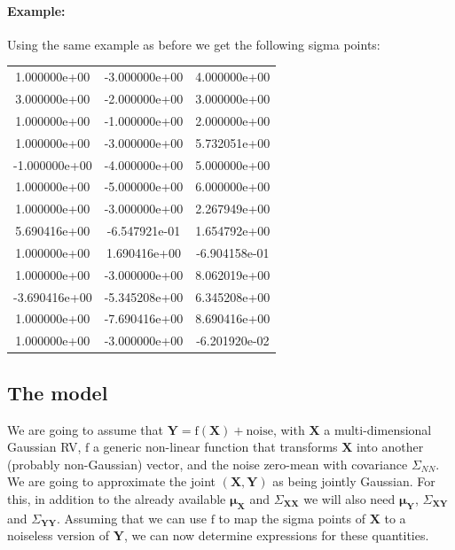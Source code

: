 \paragraph{Example: }

Using the same example as before we get the following sigma points:

\begin{tabular}{ccc}
 1.000000e+00 & -3.000000e+00 &  4.000000e+00\\
 3.000000e+00 & -2.000000e+00 &  3.000000e+00\\
 1.000000e+00 & -1.000000e+00 &  2.000000e+00\\
 1.000000e+00 & -3.000000e+00 &  5.732051e+00\\
-1.000000e+00 & -4.000000e+00 &  5.000000e+00\\
 1.000000e+00 & -5.000000e+00 &  6.000000e+00\\
 1.000000e+00 & -3.000000e+00 &  2.267949e+00\\
 5.690416e+00 & -6.547921e-01 &  1.654792e+00\\
 1.000000e+00 &  1.690416e+00 & -6.904158e-01\\
 1.000000e+00 & -3.000000e+00 &  8.062019e+00\\
-3.690416e+00 & -5.345208e+00 &  6.345208e+00\\
 1.000000e+00 & -7.690416e+00 &  8.690416e+00\\
 1.000000e+00 & -3.000000e+00 & -6.201920e-02

\end{tabular}


\subsection{The model\label{sec:sigma_point_model}}

We are going to assume that $\mathbf{Y}=\text{f}(\mathbf{X})+\text{{noise}}$,
with $\mathbf{X}$ a multi-dimensional Gaussian RV, $\text{f}$ a
generic non-linear function that transforms $\mathbf{X}$ into another
(probably non-Gaussian) vector, and the noise zero-mean with covariance
$\Sigma_{NN}$. We are going to approximate the joint $(\mathbf{X},\mathbf{Y})$
as being jointly Gaussian. For this, in addition to the already available
$\mathbf{\mu_{X}}$ and $\Sigma_{\mathbf{XX}}$ we will also need
$\mathbf{\mu_{Y}}$, $\Sigma_{\mathbf{XY}}$ and $\Sigma_{\mathbf{YY}}$.
Assuming that we can use $\text{f}$ to map the sigma points of $\mathbf{X}$
to a noiseless version of $\mathbf{Y}$, we can now determine expressions
for these quantities.

